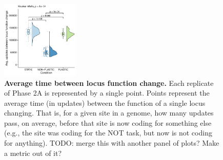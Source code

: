 \begin{figure}[ht!]
    \centering
    \includegraphics[width=0.33\textwidth]{media/architecture/avg_time_between_func_changes_weighted_mean.pdf}
    \caption{\small
        \textbf{Average time between locus function change.}
        Each replicate of Phase 2A is represented by a single point. 
        Points represent the average time (in updates) between the function of a single locus changing. 
        That is, for a given site in a genome, how many updates pass, on average, before that site is now coding for something else (e.g., the site was coding for the NOT task, but now is not coding for anything). TODO: merge this with another panel of plots? Make a metric out of it?
    }
    \label{fig:architecture_locus_change_time}
\end{figure}